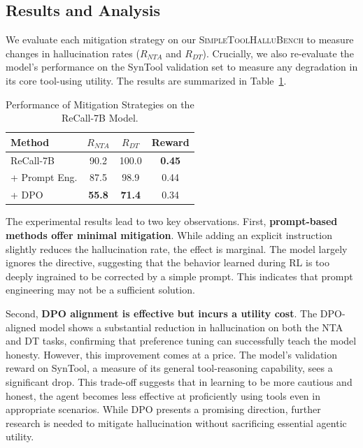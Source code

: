 \documentclass[11pt]{article}
\begin{document}
\subsection{Results and Analysis}

We evaluate each mitigation strategy on our \textsc{SimpleToolHalluBench} to measure changes in hallucination rates ($R_{NTA}$ and $R_{DT}$). Crucially, we also re-evaluate the model's performance on the SynTool validation set to measure any degradation in its core tool-using utility. The results are summarized in Table~\ref{tab:mitigation}.

\begin{table}[t]
\caption{Performance of Mitigation Strategies on the ReCall-7B Model.}
\label{tab:mitigation}
\begin{center}
\begin{tabular}{lccc}
\toprule
\textbf{Method} & \textbf{$R_{NTA}$} & \textbf{$R_{DT}$} & \textbf{Reward} \\
\midrule
ReCall-7B & 90.2 & 100.0 & \textbf{0.45} \\
+ Prompt Eng. & 87.5 & 98.9 & 0.44 \\
+ DPO & \textbf{55.8} & \textbf{71.4} & 0.34 \\
\bottomrule
\end{tabular}
\end{center}
\end{table}

The experimental results lead to two key observations. First, \textbf{prompt-based methods offer minimal mitigation}. While adding an explicit instruction slightly reduces the hallucination rate, the effect is marginal. The model largely ignores the directive, suggesting that the behavior learned during RL is too deeply ingrained to be corrected by a simple prompt. This indicates that prompt engineering may not be a sufficient solution.

Second, \textbf{DPO alignment is effective but incurs a utility cost}. The DPO-aligned model shows a substantial reduction in hallucination on both the NTA and DT tasks, confirming that preference tuning can successfully teach the model honesty. However, this improvement comes at a price. The model's validation reward on SynTool, a measure of its general tool-reasoning capability, sees a significant drop. This trade-off suggests that in learning to be more cautious and honest, the agent becomes less effective at proficiently using tools even in appropriate scenarios. While DPO presents a promising direction, further research is needed to mitigate hallucination without sacrificing essential agentic utility.
\end{document}
